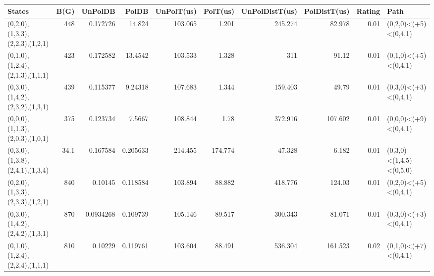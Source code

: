 \begin{tabular}{lrrrrrrrrl}
\hline
 States                          &   B(G) &   UnPolDB &     PolDB &   UnPolT(us) &   PolT(us) &   UnPolDistT(us) &   PolDistT(us) &   Rating & Path                    \\
\hline
 (0,2,0),(1,3,3),(2,2,3),(1,2,1) &  448   & 0.172726  & 14.824    &      103.065 &      1.201 &          245.274 &         82.978 &     0.01 & (0,2,0)<(+5)<(0,4,1)    \\
 (0,1,0),(1,2,4),(2,1,3),(1,1,1) &  423   & 0.172582  & 13.4542   &      103.533 &      1.328 &          311     &         91.12  &     0.01 & (0,1,0)<(+5)<(0,4,1)    \\
 (0,3,0),(1,4,2),(2,3,2),(1,3,1) &  439   & 0.115377  &  9.24318  &      107.683 &      1.344 &          159.403 &         49.79  &     0.01 & (0,3,0)<(+3)<(0,4,1)    \\
 (0,0,0),(1,1,3),(2,0,3),(1,0,1) &  375   & 0.123734  &  7.5667   &      108.844 &      1.78  &          372.916 &        107.602 &     0.01 & (0,0,0)<(+9)<(0,4,1)    \\
 (0,3,0),(1,3,8),(2,4,1),(1,3,4) &   34.1 & 0.167584  &  0.205633 &      214.455 &    174.774 &           47.328 &          6.182 &     0.01 & (0,3,0)<(1,4,5)<(0,5,0) \\
 (0,2,0),(1,3,3),(2,3,3),(1,2,1) &  840   & 0.10145   &  0.118584 &      103.894 &     88.882 &          418.776 &        124.03  &     0.01 & (0,2,0)<(+5)<(0,4,1)    \\
 (0,3,0),(1,4,2),(2,4,2),(1,3,1) &  870   & 0.0934268 &  0.109739 &      105.146 &     89.517 &          300.343 &         81.071 &     0.01 & (0,3,0)<(+3)<(0,4,1)    \\
 (0,1,0),(1,2,4),(2,2,4),(1,1,1) &  810   & 0.10229   &  0.119761 &      103.604 &     88.491 &          536.304 &        161.523 &     0.02 & (0,1,0)<(+7)<(0,4,1)    \\
\hline
\end{tabular}